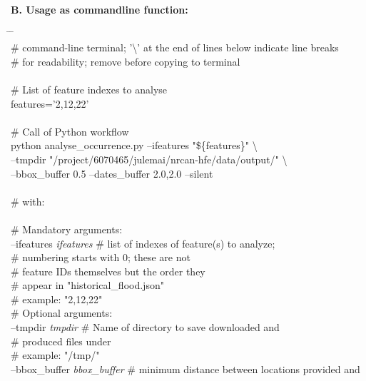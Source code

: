 \documentclass[10pt,a4paper,titlepage,parskip]{scrartcl}
\newenvironment{ttfont}{\fontfamily{\ttdefault}\selectfont}{\par}
\newcommand{\GRAU}[1]{\textcolor{ufzgray2}{#1}}
\begin{document}
\textbf{B. Usage as commandline function:}
\begin{framed}
	\vspace*{-1.2cm}
	\begin{ttfont}
		\begin{tabbing}
			\hspace{0.5cm} \= \hspace{5.2cm} \= \kill \\[4pt]
			\GRAU{\# command-line terminal; '\textbackslash' at the end of lines below indicate line breaks}\\
			\GRAU{\# for readability; remove before copying to terminal}\\
			\\
			\GRAU{\# List of feature indexes to analyse}\\
			features='2,12,22'\\
			\\
			\GRAU{\# Call of Python workflow}\\
			python analyse\_occurrence.py --ifeatures "\$\{features\}" \textbackslash \\
			\> --tmpdir "/project/6070465/julemai/nrcan-hfe/data/output/" \textbackslash \\
			\> --bbox\_buffer 0.5 --dates\_buffer 2.0,2.0 --silent\\
			\\
			\GRAU{\# with:}\\
			\\
			\> \GRAU{\# Mandatory arguments:}\\
			\> --ifeatures \textit{ifeatures} \> \GRAU{\# list of indexes of feature(s) to analyze;}\\
			\> \> \GRAU{\# numbering starts with 0; these are not }\\
			\> \> \GRAU{\# feature IDs themselves but the order they }\\
			\> \> \GRAU{\# appear in "historical\_flood.json"}\\
			\> \> \GRAU{\# example: "2,12,22"}\\
			\> \GRAU{\# Optional arguments:}\\
			\> --tmpdir \textit{tmpdir} \> \GRAU{\# Name of directory to save downloaded and}\\
			\> \> \GRAU{\# produced files under}\\
			\> \> \GRAU{\# example: "/tmp/"}\\
			\> --bbox\_buffer \textit{bbox\_buffer} \> \GRAU{\# minimum distance between locations provided and}\\

\end{tabbing}
\end{ttfont}
\end{framed}
\end{document}

